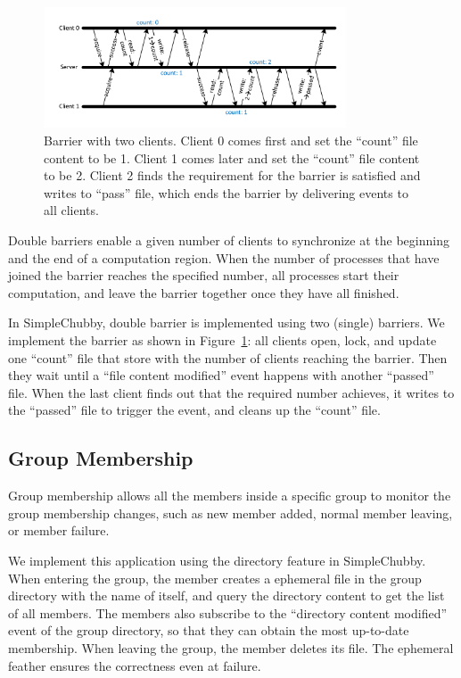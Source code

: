 \begin{figure}
\centering
\includegraphics[width=0.8\textwidth]{barrier.pdf}
\caption{Barrier with two clients. Client 0 comes first and set the ``count'' file
content to be 1. Client 1 comes later and set the ``count'' file content to be 2.
Client 2 finds the requirement for the barrier is satisfied and writes to ``pass'' file,
which ends the barrier by delivering events to all clients.}
\label{fig:barrier}
\end{figure}

Double barriers enable a given number of clients to synchronize at the
beginning and the end of a computation region. When the number of processes
that have joined the barrier reaches the specified number, all processes
start their computation, and leave the barrier together once they have all
finished.

In SimpleChubby, double barrier is implemented using two (single) barriers.
We implement the barrier as shown in Figure~\ref{fig:barrier}: all clients open, lock, and update
one ``count'' file that store with the number of clients reaching the barrier.
Then they wait until a ``file content modified'' event happens with another
``passed'' file. When the last client finds out that the required number
achieves, it writes to the ``passed'' file to trigger the event, and cleans
up the ``count'' file.

\subsection{Group Membership}

Group membership allows all the members inside a specific group to monitor
the group membership changes, such as new member added, normal member leaving,
or member failure.

We implement this application using the directory feature in SimpleChubby.
When entering the group, the member creates a ephemeral file in the group
directory with the name of itself, and query the directory content to get
the list of all members. The members also subscribe to the ``directory content
modified'' event of the group directory, so that they can obtain the most
up-to-date membership. When leaving the group, the member deletes its file.
The ephemeral feather ensures the correctness even at failure.



